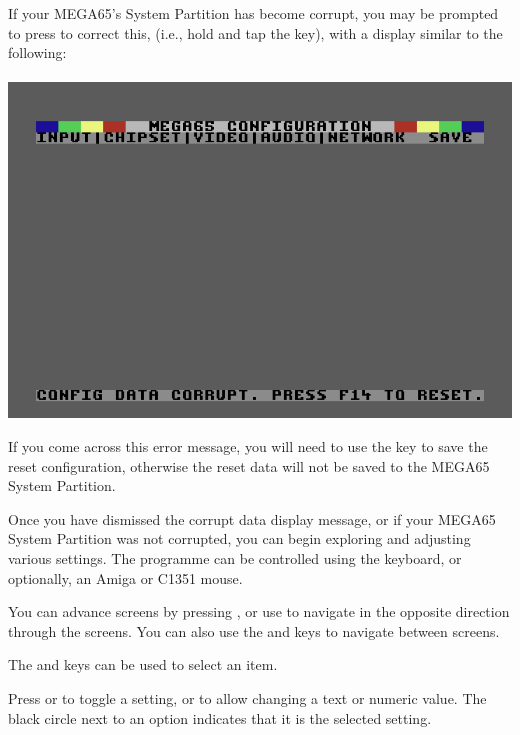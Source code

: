 \begin{minipage}{\linewidth}
  If your MEGA65's System Partition has become corrupt, you may be
  prompted to press  to correct this, (i.e., hold  and tap
  the  key), with a display similar to the following: \\
  \\
  \includegraphics[width=\linewidth]{images/ss-m65config-corrupt.png}
\end{minipage}

If you come across this error message, you will need to use the  key to save the reset configuration, otherwise
the reset data will not be saved to the MEGA65 System Partition.

Once you have dismissed the corrupt data display message, or if your MEGA65 System
Partition was not corrupted, you can begin exploring and adjusting
various settings. The programme can be controlled using the keyboard, or
optionally, an Amiga{\texttrademark} or C1351 mouse.

You can advance screens by pressing , or use 
to navigate in the opposite direction through the screens. You can also
use the \megakey{$\leftarrow$} and \megakey{$\rightarrow$} keys to
navigate between screens.

The
\megakey{$\uparrow$} and \megakey{$\downarrow$} keys can be used to
select an item.

Press  or  to toggle a setting, or to
allow changing a text or numeric value.  The black circle next to an
option indicates that it is the selected setting.

